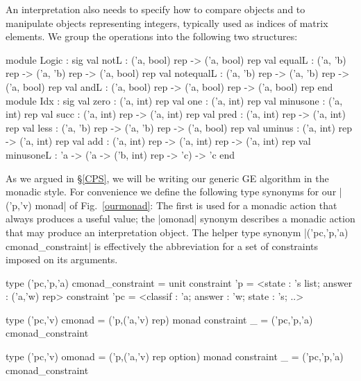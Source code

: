 \documentclass{elsart}
\begin{document}
An interpretation also needs to specify how to compare objects
and to manipulate objects representing integers, typically used as
indices of matrix elements. We group the operations into the
following two structures:
\begin{code}
module Logic : sig
  val notL      : ('a, bool) rep -> ('a, bool) rep
  val equalL    : ('a, 'b) rep   -> ('a, 'b) rep   -> ('a, bool) rep
  val notequalL : ('a, 'b) rep   -> ('a, 'b) rep   -> ('a, bool) rep
  val andL      : ('a, bool) rep -> ('a, bool) rep -> ('a, bool) rep
end
module Idx : sig
  val zero : ('a, int) rep
  val one  : ('a, int) rep
  val minusone : ('a, int) rep
  val succ : ('a, int) rep -> ('a, int) rep
  val pred : ('a, int) rep -> ('a, int) rep
  val less : ('a, 'b) rep  -> ('a, 'b) rep -> ('a, bool) rep
  val uminus : ('a, int) rep -> ('a, int) rep
  val add : ('a, int) rep   -> ('a, int) rep -> ('a, int) rep
  val minusoneL : 'a -> ('a -> ('b, int) rep -> 'c) -> 'c
end
\end{code}

As we argued in \S\ref{CPS}, we will be writing our generic GE
algorithm in the monadic style. For convenience we define the
following type synonyms for our |('p,'v) monad| of Fig.~\ref{ourmonad}:
The first is used for a monadic action that always produces a useful
value; the |omonad| synonym describes a monadic action that may
produce an interpretation object. The helper
type synonym |('pc,'p,'a) cmonad_constraint| is effectively the
abbreviation for a set of constraints imposed on its arguments.
\begin{code}
type ('pc,'p,'a) cmonad_constraint = unit
  constraint 'p = <state : 's list; answer : ('a,'w) rep>
  constraint 'pc = <classif : 'a; answer : 'w; state : 's; ..>

type ('pc,'v) cmonad = ('p,('a,'v) rep) monad
  constraint _ = ('pc,'p,'a) cmonad_constraint 

type ('pc,'v) omonad = ('p,('a,'v) rep option) monad
  constraint _ = ('pc,'p,'a) cmonad_constraint 
\end{code}
\end{document}
